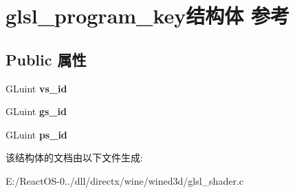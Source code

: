 \hypertarget{structglsl__program__key}{}\section{glsl\+\_\+program\+\_\+key结构体 参考}
\label{structglsl__program__key}
\subsection*{Public 属性}
\begin{DoxyCompactItemize}
\item 
\mbox{\label{structglsl__program__key_ab24a944346d37f6bad9d85b764b550a0}} 
G\+Luint {\bfseries vs\+\_\+id}
\item 
\mbox{\label{structglsl__program__key_a506a7bdcaf619e830b9289efa7cf4d5e}} 
G\+Luint {\bfseries gs\+\_\+id}
\item 
\mbox{\label{structglsl__program__key_a84264529ce8be45240c2533e2f768e95}} 
G\+Luint {\bfseries ps\+\_\+id}
\end{DoxyCompactItemize}


该结构体的文档由以下文件生成\+:\begin{DoxyCompactItemize}
\item 
E\+:/\+React\+O\+S-\/0../dll/directx/wine/wined3d/glsl\+\_\+shader.\+c\end{DoxyCompactItemize}
